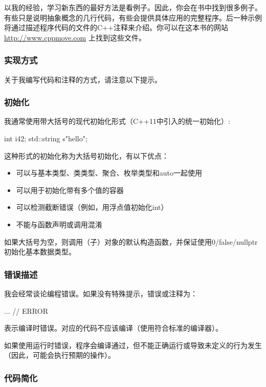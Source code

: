 以我的经验，学习新东西的最好方法是看例子。因此，你会在书中找到很多例子。有些只是说明抽象概念的几行代码，有些会提供具体应用的完整程序。后一种示例将通过描述程序代码的文件的C++注释来介绍。你可以在这本书的网站 \url{http://www.cppmove.com} 上找到这些文件。

\subsubsection{实现方式}

关于我编写代码和注释的方式，请注意以下提示。

\subsubsection{初始化}

我通常使用带大括号的现代初始化形式（C++11中引入的统一初始化）:
\begin{cppcode}
int i{42};
std::string s{"hello"};
\end{cppcode}

这种形式的初始化称为大括号初始化，有以下优点：
\begin{itemize}
	\item 可以与基本类型、类类型、聚合、枚举类型和auto一起使用
	\item 可以用于初始化带有多个值的容器
	\item 可以检测截断错误（例如，用浮点值初始化int）
	\item 不能与函数声明或调用混淆
\end{itemize}

如果大括号为空，则调用（子）对象的默认构造函数，并保证使用0/false/nullptr初始化基本数据类型。

\subsubsection{错误描述}

我会经常谈论编程错误。如果没有特殊提示，错误或注释为：

\begin{cppcode}
... // ERROR
\end{cppcode}

表示编译时错误。对应的代码不应该编译（使用符合标准的编译器）。

如果使用运行时错误，程序会编译通过，但不能正确运行或导致未定义的行为发生（因此，可能会执行预期的操作）。

\subsubsection{代码简化}

